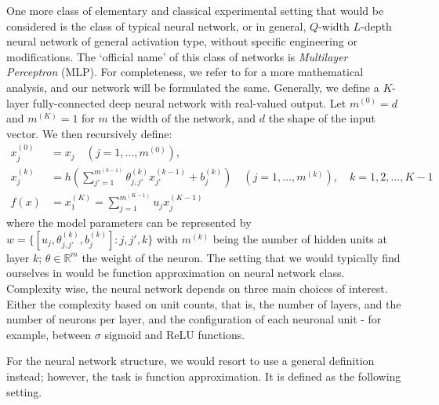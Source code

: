 One more class of elementary and classical experimental setting that would be considered is the class of typical neural network, or in general, $Q$-width $L$-depth neural network of general activation type, without specific engineering or modifications. The `official name' of this class of networks is \textit{Multilayer Perceptron} (MLP). For completeness, we refer to \cite{zhang2023mathematical} for a more mathematical analysis, and our network will be formulated the same. Generally, we define a $K$-layer fully-connected deep neural network with real-valued output. Let $m^{(0)}=d$ and $m^{(K)}=1$ for $m$ the width of the network, and $d$ the shape of the input vector. We then recursively define: 
\begin{align}
    x_{j}^{(0)} &= x_{j} \quad (j=1,\dots,m^{(0)}),\\ 
    x_{j}^{(k)} &= h\left(\sum^{m^{(k-1)}}_{j'=1} \theta_{j,j'}^{(k)}x_{j'}^{(k-1)}+ b_{j}^{(k)}\right)\quad (j=1,\dots,m^{(k)}), \quad k = 1,2,\dots,K-1\\
    f(x) & = x_{1}^{(K)} = \sum^{m^{(K-1)}}_{j=1} u_{j}x_{j}^{(K-1)}
\end{align}
where the model parameters can be represented by $w=\{[u_{j}, \theta_{j,j'}^{(k)}, b_{j}^{(k)}]: j,j',k\}$ with $m^{(k)}$ being the number of hidden units at layer $k$; $\theta\in \mathbb{R}^{m}$ the weight of the neuron. The setting that we would typically find ourselves in would be function approximation on neural network class. Complexity wise, the neural network depends on three main choices of interest. Either the complexity based on unit counts, that is, the number of layers, and the number of neurons per layer, and the configuration of each neuronal unit - for example, between $\sigma$ sigmoid and ReLU functions. 

For the neural network structure, we would resort to use a general definition instead; however, the task is function approximation. It is defined as the following setting. 
\vspace{2mm}

